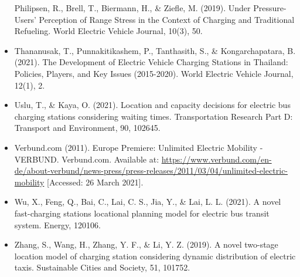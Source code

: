 \documentclass[
]{book}
\begin{document}
\begin{itemize}
  Philipsen, R., Brell, T., Biermann, H., \& Ziefle, M. (2019). Under Pressure-Users' Perception of Range Stress in the Context of Charging and Traditional Refueling. World Electric Vehicle Journal, 10(3), 50.
\item
  Thananusak, T., Punnakitikashem, P., Tanthasith, S., \& Kongarchapatara, B. (2021). The Development of Electric Vehicle Charging Stations in Thailand: Policies, Players, and Key Issues (2015-2020). World Electric Vehicle Journal, 12(1), 2.
\item
  Uslu, T., \& Kaya, O. (2021). Location and capacity decisions for electric bus charging stations considering waiting times. Transportation Research Part D: Transport and Environment, 90, 102645.
\item
  Verbund.com (2011). Europe Premiere: Unlimited Electric Mobility - VERBUND. Verbund.com. Available at: \url{https://www.verbund.com/en-de/about-verbund/news-press/press-releases/2011/03/04/unlimited-electric-mobility} {[}Accessed: 26 March 2021{]}.
\item
  Wu, X., Feng, Q., Bai, C., Lai, C. S., Jia, Y., \& Lai, L. L. (2021). A novel fast-charging stations locational planning model for electric bus transit system. Energy, 120106.
\item
  Zhang, S., Wang, H., Zhang, Y. F., \& Li, Y. Z. (2019). A novel two-stage location model of charging station considering dynamic distribution of electric taxis. Sustainable Cities and Society, 51, 101752.
\end{itemize}

  
\end{document}
